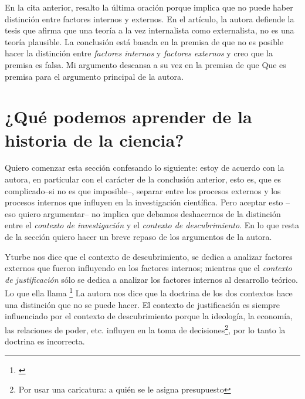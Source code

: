 En la cita anterior, resalto la última oración porque implica que no puede haber distinción entre factores internos y externos.
En el artículo, la autora defiende la tesis que afirma que una teoría a la vez internalista como externalista, no es una teoría plausible.
La conclusión está basada en la premisa de que no es posible hacer la distinción entre \emph{factores internos} y \emph{factores externos} y
creo que la premisa es falsa.
Mi argumento descansa a su vez en la premisa de que 
Que es premisa para el argumento principal de la autora.



\section{¿Qué podemos aprender de la historia de la ciencia?}

\noindent Quiero comenzar esta sección confesando lo siguiente: estoy de acuerdo con la autora, en particular con el carácter de la conclusión anterior, esto es, que es complicado--si no es que imposible--, separar entre los procesos externos y los procesos internos que influyen en la investigación científica.
Pero aceptar esto --eso quiero argumentar-- no implica que debamos deshacernos de la distinción entre el \emph{contexto de investigación} y el \emph{contexto de descubrimiento}.
En lo que resta de la sección quiero hacer un breve repaso de los argumentos de la autora.

Yturbe nos dice que el contexto de descubrimiento, se dedica a analizar factores externos que fueron influyendo en los factores internos; mientras que el \emph{contexto de justificación} sólo se dedica a analizar los factores internos al desarrollo teórico.
Lo que ella llama \footnote{
	 \cite[][p. 75]{Yturbe1995}
}
La autora nos dice que la doctrina de los dos contextos hace una distinción que no se puede hacer.
El contexto de justificación es siempre influenciado por el contexto de descubrimiento porque la ideología, la economía, las relaciones de poder, etc. influyen en la toma de decisiones\footnote{Por usar una caricatura: a quién se le asigna presupuesto}, por lo tanto la doctrina es incorrecta.


